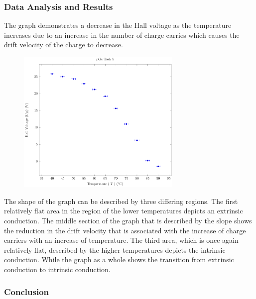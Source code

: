 \documentclass[a4paper]{article}
\begin{document}
\subsubsection{Data Analysis and Results}
\qq The graph demonstrates a decrease in the Hall voltage as the
temperature increases due to an increase in the number of charge
carries which causes the drift velocity of the charge to decrease.

\begin{figure}[H]
\centering
\includegraphics[width=0.7\textwidth]{PGePlots/Task5/pGeTask5.pdf}
\label{task25plot}
\end{figure}

\qq The shape of the graph can be described by three differing
regions. The first relatively flat area in the region of the lower
temperatures depicts an extrinsic conduction. The middle section of
the graph that is described by the slope shows the reduction in the
drift velocity that is associated with the increase of charge carriers
with an increase of temperature. The third area, which is once again
relatively flat, described by the higher temperatures depicts the
intrinsic conduction. While the graph as a whole shows the transition
from extrinsic conduction to intrinsic conduction.


\subsubsection{Conclusion}
\end{document}
